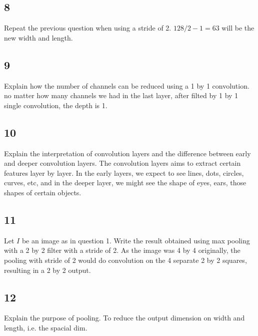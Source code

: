 \documentclass{article}
\begin{document}
\subsection*{8}
\begin{myleftlinebox}
    Repeat the previous question when using a stride of 2.
    \tcblower
    \(128/2-1=63\) will be the new width and length.
\end{myleftlinebox}
\subsection*{9}
\begin{myleftlinebox}
    Explain how the number of channels can be reduced using a 1 by 1 convolution.
    \tcblower
    no matter how many channels we had in the last layer, after filted by 1 by 1 single convolution,  the depth is 1.
\end{myleftlinebox}

\subsection*{10}
\begin{myleftlinebox}
    Explain the interpretation of convolution layers and the difference between early and deeper convolution layers.
    \tcbline
    The convolution layers aims to extract certain features layer by layer. In the early layers, we expect to see lines, dots, circles, curves, etc, and in the deeper layer, we might see the shape of eyes, ears, those shapes of certain objects.
\end{myleftlinebox}

\subsection*{11}
\begin{myleftlinebox}
    Let \(I\) be an image as in question 1. Write the result obtained using max pooling with a 2 by 2 filter with a stride of 2.
    \tcbline
    As the image was 4 by 4 originally, the pooling with stride of 2 would do convolution on the 4 separate 2 by 2 squares, resulting in a 2 by 2 output.
\end{myleftlinebox}

\subsection*{12}
\begin{myleftlinebox}
    Explain the purpose of pooling.
    \tcbline
    To reduce the output dimension on width and length, i.e. the spacial dim.
\end{myleftlinebox}
\end{document}
